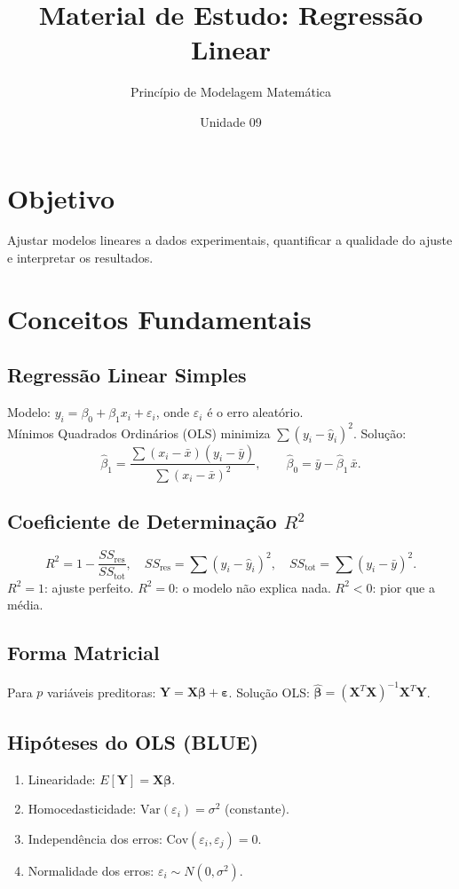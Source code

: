 \documentclass[12pt,a4paper]{article}
\title{Material de Estudo: Regress\~ao Linear}
\author{Princ\'ipio de Modelagem Matem\'atica}
\date{Unidade 09}
\begin{document}
\maketitle

\section*{Objetivo}
Ajustar modelos lineares a dados experimentais, quantificar a qualidade do ajuste e interpretar os resultados.

\section*{Conceitos Fundamentais}

\subsection*{Regress\~ao Linear Simples}
Modelo: $y_i = \beta_0 + \beta_1 x_i + \varepsilon_i$, onde $\varepsilon_i$ \'e o erro aleat\'orio.\\
M\'inimos Quadrados Ordin\'arios (OLS) minimiza $\sum(y_i - \hat y_i)^2$. Solu\c{c}\~ao:
\[
\hat\beta_1 = \frac{\sum(x_i-\bar x)(y_i-\bar y)}{\sum(x_i-\bar x)^2}, \qquad \hat\beta_0 = \bar y - \hat\beta_1\,\bar x.
\]

\subsection*{Coeficiente de Determina\c{c}\~ao $R^2$}
\[
R^2 = 1 - \frac{SS_\text{res}}{SS_\text{tot}}, \quad SS_\text{res} = \sum(y_i-\hat y_i)^2, \quad SS_\text{tot} = \sum(y_i-\bar y)^2.
\]
$R^2 = 1$: ajuste perfeito. $R^2 = 0$: o modelo n\~ao explica nada. $R^2 < 0$: pior que a m\'edia.

\subsection*{Forma Matricial}
Para $p$ vari\'aveis preditoras: $\mathbf{Y} = \mathbf{X}\boldsymbol\beta + \boldsymbol\varepsilon$.
Solu\c{c}\~ao OLS: $\hat{\boldsymbol\beta} = (\mathbf{X}^T\mathbf{X})^{-1}\mathbf{X}^T\mathbf{Y}$.

\subsection*{Hip\'oteses do OLS (BLUE)}
\begin{enumerate}
  \item Linearidade: $E[\mathbf{Y}] = \mathbf{X}\boldsymbol\beta$.
  \item Homocedasticidade: $\text{Var}(\varepsilon_i) = \sigma^2$ (constante).
  \item Independ\^encia dos erros: $\text{Cov}(\varepsilon_i,\varepsilon_j) = 0$.
  \item Normalidade dos erros: $\varepsilon_i \sim N(0,\sigma^2)$.
\end{enumerate}
\end{document}
